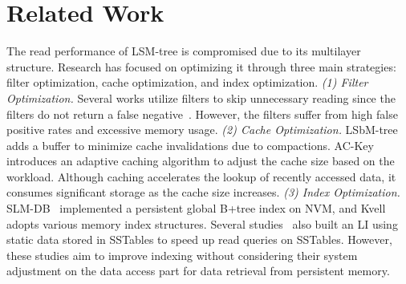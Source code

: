 \section{Related Work}
\label{sec:related-work}

The read performance of LSM-tree is compromised due to its multilayer structure. Research has focused on optimizing it through three main strategies: filter optimization, cache optimization, and index optimization. \textit{(1) Filter Optimization.}  Several works utilize filters to skip unnecessary reading since the filters do not return a false negative~\cite{li2019elasticbf, wang2024grf}. However, the filters suffer from high false positive rates and excessive memory usage. \textit{(2) Cache Optimization.} LSbM-tree~\cite{teng2017lsbm} adds a buffer to minimize cache invalidations due to compactions. AC-Key~\cite{wu2020ac} introduces an adaptive caching algorithm to adjust the cache size based on the workload. Although caching accelerates the lookup of recently accessed data, it consumes significant storage as the cache size increases. \textit{(3) Index Optimization.} SLM-DB~\cite{kaiyrakhmet2019slm} implemented a persistent global B+tree index on NVM, and Kvell~\cite{lepers2019kvell} adopts various memory index structures. Several studies~\cite{Bourbon2020, leaderkv2024, TridentKV2022} also built an LI using static data stored in SSTables to speed up read queries on SSTables. However, these studies aim to improve indexing without considering their system adjustment on the data access part for data retrieval from persistent memory. 

